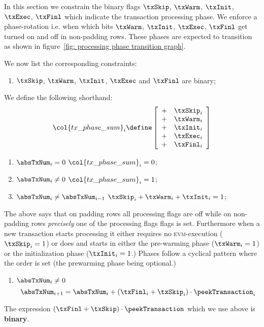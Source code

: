 \def\locTransactionPhaseSum                                             {\col{tx\_phase\_sum}}
\def\locAcceptableTransactionPhaseFlagsAtFirstRowOfNewTransaction       {\txSkip_{i} + \txWarm_{i} + \txInit_{i} = 1}
In this section we constrain the binary flags $\txSkip$, $\txWarm$, $\txInit$, $\txExec$, $\txFinl$ which indicate the transaction processing phase. We enforce a phase-rotation i.e. when which bits $\txWarm$, $\txInit$, $\txExec$, $\txFinl$ get turned on and off in non-padding rows.
These phases are expected to transition as shown in figure~\ref{fig: processing phase transition graph}.



\noindent We now list the corresponding constraints:
\begin{enumerate}
	\item $\txSkip$, $\txWarm$, $\txInit$, $\txExec$ and $\txFinl$ are binary;
\end{enumerate}
We define the following shorthand:
\[
	\locTransactionPhaseSum_{i}
	\define
	\left[ \begin{array}{cl}
		+ & \txSkip_{i} \\ 
		+ & \txWarm_{i} \\
		+ & \txInit_{i} \\
		+ & \txExec_{i} \\
		+ & \txFinl_{i} \\
	\end{array} \right]
\]
\begin{enumerate}[resume] \label{hub:heartbeat: tx phase sum constraints}
	\item \If $\absTxNum_{i} = 0$ \Then $\locTransactionPhaseSum_{i} = 0$;
	\item \label{hub: heartbeat: tx phase flag exclusivity}
		\If $\absTxNum_{i} \neq 0$ \Then $\locTransactionPhaseSum_{i} = 1$;
	\item \label{hub: heartbeat: acceptable tx phases at first row of new transaction}
		\If $\absTxNum_{i} \neq \absTxNum_{i - 1}$ \Then $\locAcceptableTransactionPhaseFlagsAtFirstRowOfNewTransaction$;
\end{enumerate}
The above says that on padding rows all processing flags are off while on non-padding rows \emph{precisely} one of the processing flags flags is set. Furthermore when a new transaction starts processing it either
requires no \textsc{evm}-execution ($\txSkip_{i} = 1$)
or does and starts in either the pre-warming phase ($\txWarm_{i} = 1$)
or the initialization phase ($\txInit_{i} = 1$.)
Phases follow a cyclical pattern where the order is set (the prewarming phase being optional.)
\begin{enumerate}[resume]
	\item\label{hub: heartbeat: abs tx num increments}
		\If $\absTxNum_{i} \neq 0$ \Then
		\[ \absTxNum_{i + 1} = \absTxNum_{i} + (\txFinl_{i} + \txSkip_{i}) \cdot \peekTransaction_{i} \]
\end{enumerate}
\saNote{} The expression $(\txFinl + \txSkip) \cdot \peekTransaction$ which we use above is \textbf{binary}.

